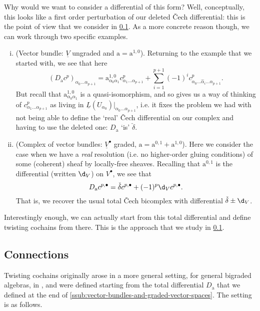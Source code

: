         Why would we want to consider a differential of this form?
        Well, conceptually, this looks like a first order perturbation of our deleted Čech differential: this is the point of view that we consider in \cref{ssub:connections}.
        As a more concrete reason though, we can work through two specific examples.

        \begin{enumerate}[(i)]
            \item (Vector bundle: $\underline{V}$ ungraded and $\mathrm{a}=\mathrm{a}^{1,0}$).
                Returning to the example that we started with, we see that here
                \[(D_\mathrm{a}c^p)_{\alpha_0\ldots\alpha_{p+1}} = \mathrm{a}^{1,0}_{\alpha_0\alpha_1}c^p_{\alpha_1\ldots\alpha_{p+1}} + \sum_{i=1}^{p+1}(-1)^ic^p_{\alpha_0\ldots\hat{\alpha}_i\ldots\alpha_{p+1}}.\]
                But recall that $\mathrm{a}^{1,0}_{\alpha_0\alpha_1}$ is a quasi-isomorphism, and so gives us a way of thinking of $c^p_{\alpha_1\ldots\alpha_{p+1}}$ as living in $\underline{L}(U_{\alpha_0})|_{\alpha_0\ldots\alpha_{p+1}}$, i.e. it fixes the problem we had with not being able to define the `real' Čech differential on our complex and having to use the deleted one: $D_\mathrm{a}$ `is' $\check{\delta}$.
            \item (Complex of vector bundles: $\underline{V}^\bullet$ graded, $\mathrm{a}=\mathrm{a}^{0,1}+\mathrm{a}^{1,0}$).
                Here we consider the case when we have a \textit{real} resolution (i.e. no higher-order gluing conditions) of some (coherent) sheaf by locally-free sheaves.
                Recalling that $\mathrm{a}^{0,1}$ is the differential (written $\d_V$) on $V^\bullet$, we see that
                \[D_\mathrm{a}c^{p,\bullet} = \check{\delta}c^{p,\bullet} + (-1)^p\d_V c^{p,\bullet}.\]
                That is, we recover the usual total Čech bicomplex with differential $\check{\delta}\pm\d_V$.
        \end{enumerate}

        Interestingly enough, we can actually start from this total differential and define twisting cochains from there.
        This is the approach that we study in \cref{ssub:connections}.

    \subsection{Connections}\label{ssub:connections}

        Twisting cochains originally arose in a more general setting, for general bigraded algebras, in \cite[§8]{Toledo:1976gy}, and were defined starting from the total differential $D_\mathrm{a}$ that we defined at the end of \cref{ssub:vector-bundles-and-graded-vector-spaces}.
        The setting is as follows.

